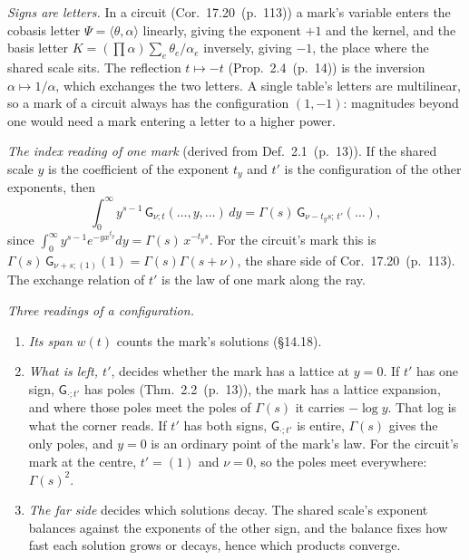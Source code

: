 \documentclass[11pt]{article}
\newcommand{\ip}[2]{\langle #1,#2\rangle}
\newcommand{\sG}{\mathsf G}
\newcommand{\hb}[2]{#1~(p.~#2)}   %
\theoremstyle{plain}
\theoremstyle{remark}
\begin{document}
\emph{Signs are letters.} In a circuit (Cor.~\hb{17.20}{113}) a mark's variable enters the cobasis letter $\Psi=\ip\theta\alpha$ linearly, giving the exponent $+1$ and the kernel, and the basis letter $K=(\prod\alpha)\sum_e\theta_e/\alpha_e$ inversely, giving $-1$, the place where the shared scale sits. The reflection $t\mapsto-t$ (Prop.~\hb{2.4}{14}) is the inversion $\alpha\mapsto1/\alpha$, which exchanges the two letters. A single table's letters are multilinear, so a mark of a circuit always has the configuration $(1,-1)$: magnitudes beyond one would need a mark entering a letter to a higher power.

\emph{The index reading of one mark} (derived from Def.~\hb{2.1}{13}). If the shared scale $y$ is the coefficient of the exponent $t_y$ and $t'$ is the configuration of the other exponents, then
\[
\int_0^\infty y^{s-1}\,\sG_{\nu;t}(\dots,y,\dots)\,dy=\Gamma(s)\,\sG_{\nu-t_ys;\,t'}(\dots),
\]
since $\int_0^\infty y^{s-1}e^{-yx^{t_y}}dy=\Gamma(s)\,x^{-t_ys}$. For the circuit's mark this is $\Gamma(s)\,\sG_{\nu+s;(1)}(1)=\Gamma(s)\Gamma(s+\nu)$, the share side of Cor.~\hb{17.20}{113}. The exchange relation of $t'$ is the law of one mark along the ray.

\emph{Three readings of a configuration.}
\begin{enumerate}[label=(\roman*)]
\item \emph{Its span} $w(t)$ counts the mark's solutions (\S14.18).
\item \emph{What is left, $t'$}, decides whether the mark has a lattice at $y=0$. If $t'$ has one sign, $\sG_{\cdot;t'}$ has poles (Thm.~\hb{2.2}{13}), the mark has a lattice expansion, and where those poles meet the poles of $\Gamma(s)$ it carries $-\log y$. That log is what the corner reads. If $t'$ has both signs, $\sG_{\cdot;t'}$ is entire, $\Gamma(s)$ gives the only poles, and $y=0$ is an ordinary point of the mark's law. For the circuit's mark at the centre, $t'=(1)$ and $\nu=0$, so the poles meet everywhere: $\Gamma(s)^2$.
\item \emph{The far side} decides which solutions decay. The shared scale's exponent balances against the exponents of the other sign, and the balance fixes how fast each solution grows or decays, hence which products converge.
\end{enumerate}
\end{document}
